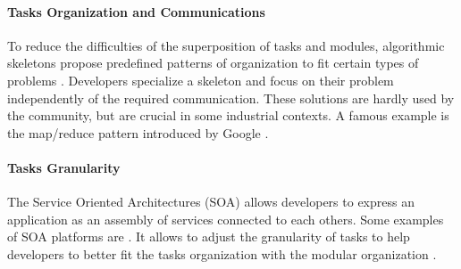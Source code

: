 \paragraph{Tasks Organization and Communications}

To reduce the difficulties of the superposition of tasks and modules, algorithmic skeletons propose predefined patterns of organization to fit certain types of problems \cite{Cole1988, Dean2008, McCool2010, Gonzalez-Velez2010}.
Developers specialize a skeleton and focus on their problem independently of the required communication.
These solutions are hardly used by the community, but are crucial in some industrial contexts.
A famous example is the map/reduce pattern introduced by Google \cite{Dean2008}.




\paragraph{Tasks Granularity}

The Service Oriented Architectures (SOA) allows developers to express an application as an assembly of services connected to each others.
Some examples of SOA platforms are .
It allows to adjust the granularity of tasks to help developers to better fit the tasks organization with the modular organization \cite{Adam2008}.

